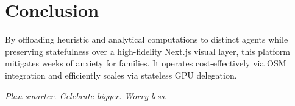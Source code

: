 \documentclass[11pt, a4paper]{report}
\begin{document}
\section{Conclusion}
By offloading heuristic and analytical computations to distinct agents while preserving statefulness over a high-fidelity Next.js visual layer, this platform mitigates weeks of anxiety for families. It operates cost-effectively via OSM integration and efficiently scales via stateless GPU delegation. 

\vspace{2cm}
\begin{center}
    \Large \textit{Plan smarter. Celebrate bigger. Worry less.}
\end{center}
\end{document}
